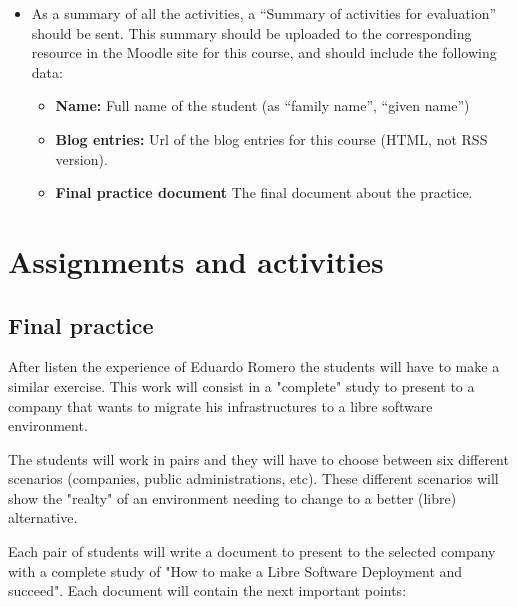 \documentclass[a4paper]{article}
\begin{document}
\begin{itemize}
\item As a summary of all the activities, a ``Summary of activities for evaluation'' should be sent. This summary should be uploaded to the corresponding resource in the Moodle site for this course, and should include the following data:
  \begin{itemize}
  \item \textbf{Name:} Full name of the student (as ``family name'', ``given name'')
  \item \textbf{Blog entries:} Url of the blog entries for this course (HTML, not RSS version).
  \item \textbf{Final practice document} The final document about the practice.  
  \end{itemize}
\end{itemize}

\section{Assignments and activities}

\subsection{Final practice}

After listen the experience of Eduardo Romero the students will have to make a similar exercise. This work will consist in a "complete" study to present to a company that wants to migrate his infrastructures to a libre software environment. 

The students will work in pairs and they will have to choose between six different scenarios (companies, public administrations, etc). These different scenarios will show the "realty" of an environment needing to change to a better (libre) alternative. 

Each pair of students will write a document to present to the selected company with a complete study of "How to make a Libre Software Deployment and succeed". Each document will contain the next important points:
\end{document}
